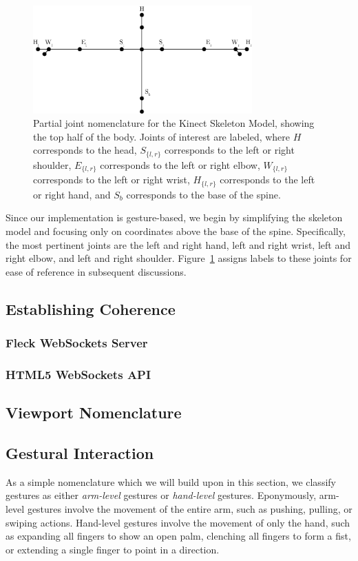 \documentclass{scrartcl}
\begin{document}
      \begin{figure}[ht!]
        \centering
        \includegraphics[width=0.75\textwidth]{img/Body}
        \caption{Partial joint nomenclature for the Kinect Skeleton Model, showing the top half of the body. Joints of interest are labeled, where $H$ corresponds to the head, $S_{\{ l,r \}}$ corresponds to the left or right shoulder, $E_{\{ l,r \}}$ corresponds to the left or right elbow, $W_{\{ l,r \}}$ corresponds to the left or right wrist, $H_{\{ l,r \}}$ corresponds to the left or right hand, and $S_b$ corresponds to the base of the spine.\label{fig:jointnomenclature}}
      \end{figure}
      Since our implementation is gesture-based, we begin by simplifying the skeleton model and focusing only on coordinates above the base of the spine. Specifically, the most pertinent joints are the left and right hand, left and right wrist, left and right elbow, and left and right shoulder. Figure~\ref{fig:jointnomenclature} assigns labels to these joints for ease of reference in subsequent discussions.
    \subsection{Establishing Coherence\label{phase2}}
      \subsubsection{Fleck WebSockets Server}
      \subsubsection{HTML5 WebSockets API}
      \subsection{Viewport Nomenclature}
    \subsection{Gestural Interaction\label{phase3}}
      As a simple nomenclature which we will build upon in this section, we classify gestures as either \emph{arm-level} gestures or \emph{hand-level} gestures. Eponymously, arm-level gestures involve the movement of the entire arm, such as pushing, pulling, or swiping actions. Hand-level gestures involve the movement of only the hand, such as expanding all fingers to show an open palm, clenching all fingers to form a fist, or extending a single finger to point in a direction.
\end{document}
